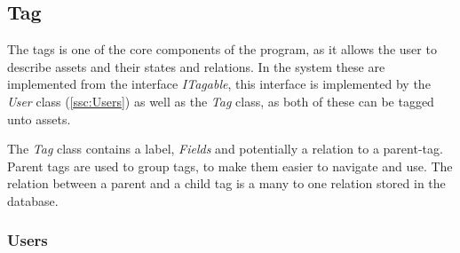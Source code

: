 \subsection{Tag}
The tags is one of the core components of the program, as it allows the user to describe assets and their states and relations. In the system these are implemented from the interface \textit{ITagable}, this interface is implemented by the \textit{User} class (\autoref{ssc:Users}) as well as the \textit{Tag} class, as both of these can be tagged unto assets. \par
The \textit{Tag} class contains a label, \textit{Fields} and potentially a relation to a parent-tag. Parent tags are used to group tags, to make them easier to navigate and use. The relation between a parent and a child tag is a many to one relation stored in the database.


\subsubsection{Users} \label{ssc:Users}